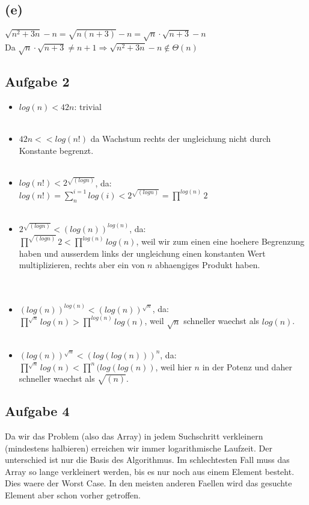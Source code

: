 \documentclass[a4paper]{scrartcl}
\begin{document}
\subsection*{(e)}
 $\sqrt{n^2 + 3n} - n = \sqrt{n(n + 3)} - n = \sqrt{n} \cdot \sqrt{n+3} - n$\\
 Da $\sqrt{n} \cdot \sqrt{n+3} \neq n+1 \Rightarrow \sqrt{n^2 + 3n} - n \not \in \Theta(n)$  



\subsection*{Aufgabe 2}
\begin{itemize}
	
\item $log(n) < 42n$: trivial\\
\\
\item $42n < < log(n!)$ da Wachstum rechts der ungleichung nicht durch Konstante begrenzt.
\\\\
\item $log(n!) < 2^{\sqrt{(log n)}}$, da:\\
$log(n!) = \sum_{n}^{i=1}log(i) <  2^{\sqrt{(log n)}} = \prod^{log(n)} 2$
\\\\
\item $2^{\sqrt{(log n)}} < (log(n))^{log(n)}$, da:\\
 $\prod^{\sqrt{(log n)}}2 < \prod^{log(n)}log(n)$, weil wir zum einen eine hoehere Begrenzung haben und ausserdem links der ungleichung einen konstanten Wert multiplizieren, rechts aber ein von $n$ abhaengiges Produkt haben.\\
\\\\
\item $(log(n))^{log(n)} < (log(n))^{\sqrt{n}}$, da:\\
$\prod^{\sqrt{n}} log(n) >  \prod^{log(n)} log(n)$, weil $\sqrt{n}$ schneller waechst als $log(n)$.\\
\\
\item $(log(n))^{\sqrt{n}} < (log(log(n)))^n$, da:\\
$\prod^{\sqrt{n}} log(n) <  \prod^{n} (log(log(n))$, weil hier $n$ in der Potenz und daher schneller waechst als $\sqrt{(n)}$.\
\end{itemize} 
 

\subsection*{Aufgabe 4}
Da wir das Problem (also das Array) in jedem Suchschritt verkleinern (mindestens halbieren) erreichen wir immer logarithmische Laufzeit. Der unterschied ist nur die Basis des Algorithmus. Im schlechtesten Fall muss das Array so lange verkleinert werden, bis es nur noch aus einem Element besteht. Dies waere der Worst Case. In den meisten anderen Faellen wird das gesuchte Element aber schon vorher getroffen.
\end{document}
